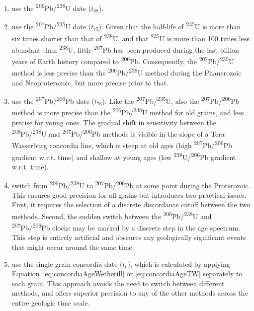 \begin{refsection}
\begin{enumerate}
\item use the \textsuperscript{206}Pb/\textsuperscript{238}U date
  ($t_{68}$).
\item use the \textsuperscript{207}Pb/\textsuperscript{235}U date
  ($t_{75}$).  Given that the half-life of \textsuperscript{235}U is
  more than six times shorter than that of \textsuperscript{238}U, and
  that \textsuperscript{235}U is more than 100 times less abundant
  than \textsuperscript{238}U, little \textsuperscript{207}Pb has been
  produced during the last billion years of Earth history compared to
  \textsuperscript{206}Pb. Consequently, the
  \textsuperscript{207}Pb/\textsuperscript{235}U method is less
  precise than the \textsuperscript{206}Pb/\textsuperscript{238}U
  method during the Phanerozoic and Neoproterozoic, but more precise
  prior to that.
\item use the \textsuperscript{207}Pb/\textsuperscript{206}Pb date
  ($t_{76}$).  Like the
  \textsuperscript{207}Pb/\textsuperscript{235}U, also the
  \textsuperscript{207}Pb/\textsuperscript{206}Pb method is more
  precise than the \textsuperscript{206}Pb/\textsuperscript{238}U
  method for old grains, and less precise for young ones.  The gradual
  shift in sensitivity between the
  \textsuperscript{206}Pb/\textsuperscript{238}U and
  \textsuperscript{207}Pb/\textsuperscript{206}Pb methods is visible
  in the slope of a Tera-Wasserburg concordia line, which is steep at
  old ages (high \textsuperscript{207}Pb/\textsuperscript{206}Pb
  gradient w.r.t. time) and shallow at young ages (low
  \textsuperscript{238}U/\textsuperscript{206}Pb gradient
  w.r.t. time).
\item switch from \textsuperscript{206}Pb/\textsuperscript{238}U to
  \textsuperscript{207}Pb/\textsuperscript{206}Pb at some point during
  the Proterozoic. This ensures good precision for all grains but
  introduces two practical issues. First, it requires the selection of
  a discrete discordance cutoff between the two methods.  Second, the
  sudden switch between the
  \textsuperscript{206}Pb/\textsuperscript{238}U and
  \textsuperscript{207}Pb/\textsuperscript{206}Pb clocks may be marked
  by a discrete step in the age spectrum. This step is entirely
  artificial and obscures any geologically significant events that
  might occur around the same time.
\item use the single grain concordia date ($t_c$), which is calculated
  by applying Equation~\ref{eq:concordiaAgeWetherill} or
  \ref{eq:concordiaAgeTW} separately to each grain. This approach
  avoids the need to switch between different methods, and offers
  superior precision to any of the other methods across the entire
  geologic time scale.
\end{enumerate}


\end{refsection}
